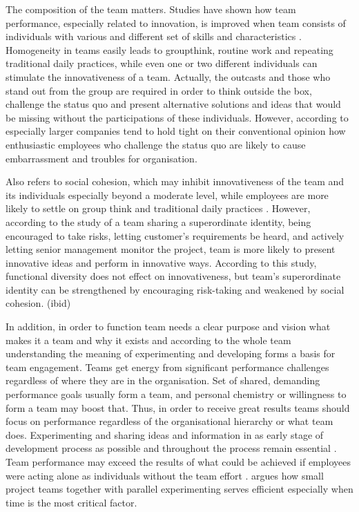 The composition of the team matters. Studies have shown how team performance, especially related to innovation, is improved when team consists of individuals with various and different set of skills and characteristics \citep{buijs2007innovation}. Homogeneity in teams easily leads to groupthink, routine work and repeating traditional daily practices, while even one or two different individuals can stimulate the innovativeness of a team. Actually, the outcasts and those who stand out from the group are required in order to think outside the box, challenge the status quo and present alternative solutions and ideas that would be missing without the participations of these individuals. \citep{sternberg1997creativity} However, according to \citet{quinn1985managing} especially larger companies tend to hold tight on their conventional opinion how enthusiastic employees who challenge the status quo are likely to cause embarrassment and troubles for organisation.

Also \citet{janis1982groupthink} refers to social cohesion, which may inhibit innovativeness of the team and its individuals especially beyond a moderate level, while employees are more likely to settle on group think and traditional daily practices . However, according to the study of \citet{sethi2001cross} a team sharing a superordinate identity, being encouraged to take risks, letting customer's requirements be heard, and actively letting senior management monitor the project, team is more likely to present innovative ideas and perform in innovative ways. According to this study, functional diversity does not effect on innovativeness, but team's superordinate identity can be strengthened by encouraging risk-taking and weakened by social cohesion. (ibid)

In addition, in order to function team needs a clear purpose and vision what makes it a team and why it exists \citep{katzenbach1993wisdom} and according to \citet{thomke2001enlightened} the whole team understanding the meaning of experimenting and developing forms a basis for team engagement. Teams get energy from significant performance challenges regardless of where they are in the organisation. Set of shared, demanding performance goals usually form a team, and personal chemistry or willingness to form a team may boost that. Thus, in order to receive great results teams should focus on performance regardless of the organisational hierarchy or what team does. \citep{katzenbach1993wisdom} Experimenting and sharing ideas and information in as early stage of development process as possible and throughout the process remain essential \citep{thomke2001enlightened}. Team performance may exceed the results of what could be achieved if employees were acting alone as individuals without the team effort \citep{katzenbach1993wisdom}. \citet{thomke2001enlightened} argues how small project teams together with parallel experimenting serves efficient especially when time is the most critical factor.

